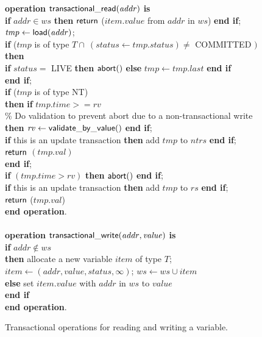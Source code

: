\documentclass[11pt,letterpaper]{article}
\begin{document}
\begin{figure}
{{\begin{minipage}[t]{150mm}
\begin{tabbing}
{\bf operation}  ${\sf transactional\_read}(\mathit{addr})$ {\bf is}\\
 \> {\bf if} $\mathit{addr} \in \mathit{ws}$  {\bf then} ${\sf return}$ ($\mathit{item.value}$ from $\mathit{addr}$ in $\mathit{ws}$)  {\bf end if}; \\
 \> $\mathit{tmp} \gets {\sf load}(\mathit{addr})$; \\
 \> {\bf if} 
   ($\mathit{tmp}$ is of type $T \cap~ (\mathit{status} \gets \mathit{tmp.status}) \neq$ COMMITTED $)$ {\bf then} \\
 \>\> {\bf if} $\mathit{status} =$ LIVE {\bf then} ${\sf abort}()$  {\bf else} $\mathit{tmp} \gets \mathit{tmp.last}$ {\bf end if} \\
 \> {\bf end if}; \\
 \> {\bf if} ($\mathit{tmp}$ is of type NT)   \\
 \>\> {\bf then} {\bf if} $\mathit{tmp.time} >= \mathit{rv}$  \\
\> \% Do validation to prevent abort due to a non-transactional write \\
 \>\>\> {\bf then} $\mathit{rv} \gets {\sf validate\_by\_value}()$ {\bf end if}; \\
 \>\> {\bf if} this is an update transaction {\bf then} add $\mathit{tmp}$ to $\mathit{ntrs}$ {\bf end if}; \\
 \>\> ${\sf return}$ $(\mathit{tmp.val})$ \\
 \> {\bf end if}; \\
 \> {\bf if} $(\mathit{tmp.time} > \mathit{rv})$ {\bf then} ${\sf abort}()$ {\bf end if}; \\
 \> {\bf if} this is an update transaction 
                        {\bf then} add $\mathit{tmp}$ to $\mathit{rs}$ {\bf end if}; \\
 \> ${\sf return}$ ($\mathit{tmp.val}$) \\
{\bf end operation}. \\
\\
{\bf operation}  ${\sf transactional\_write}(\mathit{addr, value})$ {\bf is}\\
 \> {\bf if} $\mathit{addr} \not\in \mathit{ws}$  \\
 \>\> {\bf then} \> allocate a new variable $item$ of type $T$; \\
 \>\>\> $\mathit{item}  \gets (\mathit{addr, value, status, \infty})$; 
                   $\mathit{ws} \gets \mathit{ws} \cup \mathit{item}$ \\
 \>\> {\bf else} \> set $\mathit{item.value}$ with $\mathit{addr}$ in $\mathit{ws}$ to $\mathit{value}$ \\
 \> {\bf end if} \\
{\bf end operation}.
\end{tabbing}
\normalsize
\end{minipage}
}
\caption{Transactional operations for reading and writing a variable.}
\label{fig:tops}
}
\end{figure}
\end{document}
